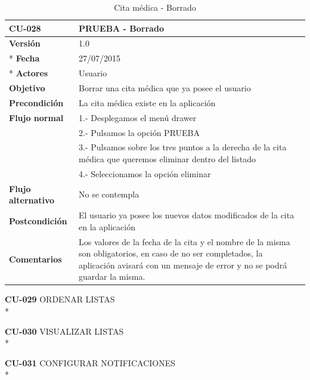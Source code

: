 \documentclass[../pfc.tex]{subfiles}
\begin{document}
		\begin{table}[H]
			\centering
			\begin{tabular}[t]{|p{3cm}|p{9.5cm}|}
				\hline \textbf{CU-028} & \textbf{PRUEBA - Borrado} \\*
				\hline\hline \textbf{Versión} & 1.0 \\ *
				\hline\hline \textbf{Fecha} & 27/07/2015 \\ *
				\hline\textbf{Actores} 	& Usuario\\*
				\hline \textbf{Objetivo} & Borrar una cita médica que ya posee el usuario\\* 			
				\hline \textbf{Precondición} & La cita médica existe en la aplicación\\* 
				\hline \textbf{Flujo normal} & 1.- Desplegamos el menú drawer \\* 
				& 2.- Pulsamos la opción PRUEBA\\*	
				& 3.- Pulsamos sobre los tres puntos a la derecha de la cita médica que queremos eliminar dentro del listado\\*	
				& 4.- Seleccionamos la opción eliminar\\*	
				\hline \textbf{Flujo alternativo} & No se contempla \\* 
				\hline \textbf{Postcondición} & El usuario ya posee los nuevos datos modificados de la cita en la aplicación \\* 
				\hline \textbf{Comentarios}   & Los valores de la fecha de la cita y el nombre de la misma son obligatorios, en caso de no ser completados, la aplicación avisará con un mensaje de error y no se podrá guardar la misma.\\*
				\hline
			\end{tabular}
			\caption{Cita médica - Borrado}
			\label{tabla:caso028}
		\end{table}
		
		
		

	

	
	
	\textbf{CU-029}	ORDENAR LISTAS\\*
	

	

	
	\textbf{CU-030}	VISUALIZAR LISTAS\\*
	

	
	
	\textbf{CU-031}	CONFIGURAR NOTIFICACIONES\\*
	
\end{document}
